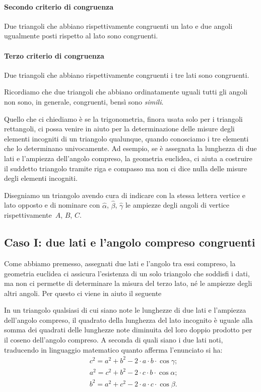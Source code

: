 \paragraph{Secondo criterio di congruenza}
Due triangoli che abbiano rispettivamente congruenti un lato e due
angoli ugualmente posti rispetto al lato sono congruenti.

\paragraph{Terzo criterio di congruenza}
Due triangoli che abbiano rispettivamente congruenti i tre lati sono congruenti.

Ricordiamo che due triangoli che abbiano ordinatamente uguali tutti gli angoli 
non sono, in generale, congruenti, bensì sono \emph{simili}.

Quello che ci chiediamo è se la trigonometria, finora usata solo per i triangoli 
rettangoli, ci possa venire in aiuto per la
determinazione delle misure degli elementi incogniti di un triangolo qualunque, 
quando conosciamo i tre elementi che lo
determinano univocamente. Ad esempio, se è assegnata la lunghezza di due lati e 
l'ampiezza dell'angolo compreso,
la geometria euclidea, ci aiuta a costruire il suddetto triangolo tramite riga e 
compasso ma non ci dice nulla delle
misure degli elementi incogniti.

Disegniamo un triangolo avendo cura di indicare con la stessa lettera vertice e 
lato opposto e di nominare con
${\hat{\alpha}}$, ${\hat{\beta}}$, ${\hat{\gamma}}$ le ampiezze degli angoli di 
vertice rispettivamente~$A$, $B$, $C$.
\begin{center}
 
\end{center}


\subsection{Caso I: due lati e l'angolo compreso congruenti}

Come abbiamo premesso, assegnati due lati e l'angolo tra essi compreso, la 
geometria euclidea ci assicura l'esistenza
di un solo triangolo che soddisfi i dati, ma non ci permette di determinare la 
misura del terzo lato, né le ampiezze degli altri angoli.
Per questo ci viene in aiuto il seguente

\begin{teorema}
In un triangolo qualsiasi di cui siano note le lunghezze di due lati e 
l'ampiezza dell'angolo compreso, il quadrato della lunghezza
del lato incognito è uguale alla somma dei quadrati delle lunghezze note 
diminuita del loro doppio prodotto per il coseno dell'angolo compreso.
A seconda di quali siano i due lati noti, traducendo in linguaggio matematico 
quanto afferma l'enunciato si ha:
\begin{align*}
&c^{2}=a^{2}+b^{2}-2\cdot a\cdot b\cdot \cos \gamma;\\
&a^{2}=c^{2}+b^{2}-2\cdot c\cdot b\cdot \cos \alpha;\\
&b^{2}=a^{2}+c^{2}-2\cdot a\cdot c\cdot \cos  \beta.
\end{align*}
\end{teorema}

